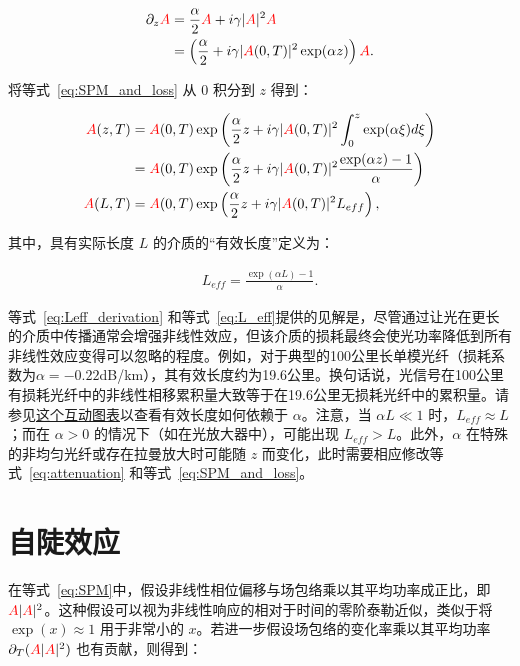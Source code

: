 \begin{align}
\label{eq:SPM_and_loss}
    \partial_z\textcolor{red}{A} &= \frac{\alpha}{2}\textcolor{red}{A} +i\gamma|\textcolor{red}{A}|^2\textcolor{red}{A}\\ \nonumber
    &=\left(\frac{\alpha}{2} +i\gamma |\textcolor{red}{A}(0,T)|^2 \exp(\alpha z) \right)\textcolor{red}{A}. 
\end{align}

将等式~\ref{eq:SPM_and_loss} 从 $0$ 积分到 $z$ 得到：

\begin{align}
    \label{eq:Leff_derivation}
    \textcolor{red}{A}(z,T)&=\textcolor{red}{A}(0,T) \exp\left( \frac{\alpha}{2}z+i\gamma|\textcolor{red}{A}(0,T)|^2 \int_0^z \exp(\alpha\xi) d\xi  \right) \\ \nonumber
    &=\textcolor{red}{A}(0,T) \exp\left( \frac{\alpha}{2}z+i\gamma|\textcolor{red}{A}(0,T)|^2  \frac{\exp(\alpha z)-1}{\alpha}   \right) \\ \nonumber
    \textcolor{red}{A}(L,T)&=\textcolor{red}{A}(0,T) \exp\left( \frac{\alpha}{2}z+i\gamma|\textcolor{red}{A}(0,T)|^2  L_{eff}   \right),
\end{align}

其中，具有实际长度 $L$ 的介质的“有效长度”定义为：

\begin{align}
\label{eq:L_eff}
    L_{eff}= \frac{\exp(\alpha L)-1}{\alpha}.
\end{align}

等式~\ref{eq:Leff_derivation} 和等式~\ref{eq:L_eff}提供的见解是，尽管通过让光在更长的介质中传播通常会增强非线性效应，但该介质的损耗最终会使光功率降低到所有非线性效应变得可以忽略的程度。例如，对于典型的100公里长单模光纤（损耗系数为$\alpha=-0.22$dB/km），其有效长度约为19.6公里。换句话说，光信号在100公里有损耗光纤中的非线性相移累积量大致等于在19.6公里无损耗光纤中的累积量。请参见\href{https://www.desmos.com/calculator/g6dadbxq33}{这个互动图表}以查看有效长度如何依赖于 $\alpha$。注意，当 $\alpha L\ll 1$ 时，$L_{eff}\approx L$；而在 $\alpha>0$ 的情况下（如在光放大器中），可能出现 $L_{eff}>L$。此外，$\alpha$ 在特殊的非均匀光纤或存在拉曼放大时可能随 $z$ 而变化，此时需要相应修改等式~\ref{eq:attenuation} 和等式~\ref{eq:SPM_and_loss}。

\section{自陡效应}
\label{sec:SS}

在等式~\ref{eq:SPM}中，假设非线性相位偏移与场包络乘以其平均功率成正比，即 $\textcolor{red}{A}|\textcolor{red}{A}|^2$。这种假设可以视为非线性响应的相对于时间的零阶泰勒近似，类似于将 $\exp(x)\approx 1$ 用于非常小的 $x$。若进一步假设场包络的变化率乘以其平均功率 $\partial_T(\textcolor{red}{A}|\textcolor{red}{A}|^2)$ 也有贡献，则得到：

